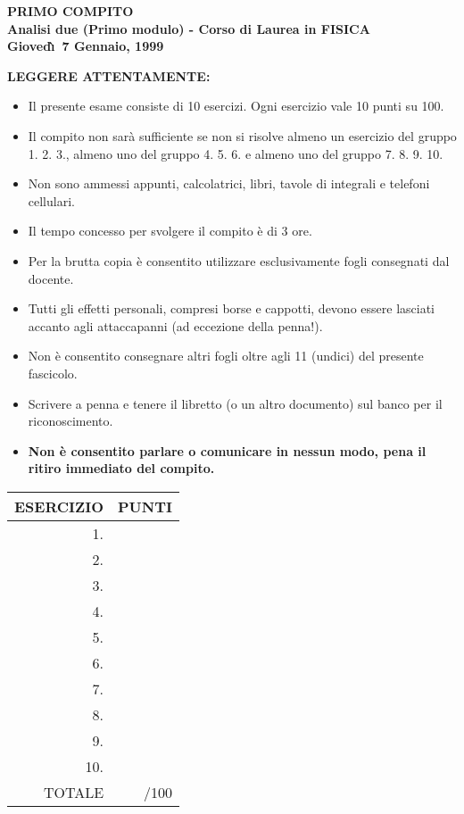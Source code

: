 \documentclass[12pt,a4paper]{report}\pagenumbering{roman}
\begin{document}
\begin{center}
\textbf{PRIMO COMPITO}\\
\textbf{Analisi due (Primo modulo) - Corso di Laurea in FISICA}\\
\textbf{Gioved\`\i\ 7 Gennaio, 1999}
\end{center}
{\Large\textbf{LEGGERE ATTENTAMENTE:}}
\begin{itemize}
\item Il presente esame consiste di 10 esercizi. Ogni esercizio 
vale 10 punti su 100.
\item Il compito non sar\`a sufficiente se non si risolve almeno 
un esercizio del gruppo 1. 2. 3., almeno 
uno del gruppo 4. 5. 6. e almeno uno del gruppo  7. 8. 9. 10.
\item Non sono ammessi appunti, calcolatrici, 
libri, tavole di integrali e telefoni cellulari.
\item Il tempo concesso per svolgere il compito \`e di 3 ore.
\item Per la brutta copia \`e consentito utilizzare 
esclusivamente fogli consegnati dal docente.
\item Tutti gli effetti personali, compresi borse e cappotti, devono 
essere lasciati accanto agli attaccapanni (ad eccezione della penna!).
\item Non \`e consentito consegnare altri fogli oltre agli 11 (undici)
del presente fascicolo.
\item Scrivere a penna e tenere il libretto (o un altro documento) sul banco per
il riconoscimento.
\item \textbf{Non \`e consentito parlare o comunicare in nessun modo, pena
il ritiro immediato del compito.} 
\end{itemize}
\begin{center}
\begin{tabular}{||r|r||}
\hline ESERCIZIO & PUNTI\\  \hline
\hline 1.& \\
\hline 2.& \\
\hline 3.& \\
\hline 4.& \\
\hline 5.& \\
\hline 6.& \\
\hline 7.& \\
\hline 8.& \\
\hline 9.& \\
\hline 10.& \\
\hline TOTALE & /100\\
\hline
\end{tabular}
\end{center}
\pagebreak
\end{document}
